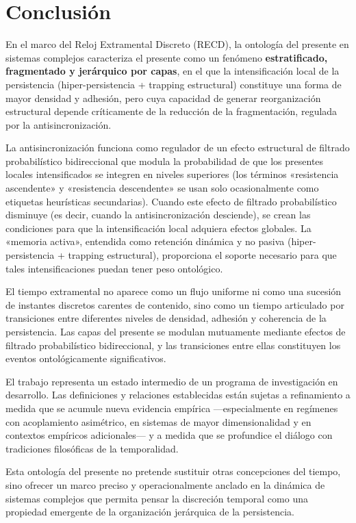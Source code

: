 \section{Conclusión}

En el marco del Reloj Extramental Discreto (RECD), la ontología del presente en sistemas complejos caracteriza el presente como un fenómeno \textbf{estratificado, fragmentado y jerárquico por capas}, en el que la intensificación local de la persistencia (hiper-persistencia + trapping estructural) constituye una forma de mayor densidad y adhesión, pero cuya capacidad de generar reorganización estructural depende críticamente de la reducción de la fragmentación, regulada por la antisincronización.

La antisincronización funciona como regulador de un efecto estructural de filtrado probabilístico bidireccional que modula la probabilidad de que los presentes locales intensificados se integren en niveles superiores (los términos «resistencia ascendente» y «resistencia descendente» se usan solo ocasionalmente como etiquetas heurísticas secundarias). Cuando este efecto de filtrado probabilístico disminuye (es decir, cuando la antisincronización desciende), se crean las condiciones para que la intensificación local adquiera efectos globales. La «memoria activa», entendida como retención dinámica y no pasiva (hiper-persistencia + trapping estructural), proporciona el soporte necesario para que tales intensificaciones puedan tener peso ontológico.

El tiempo extramental no aparece como un flujo uniforme ni como una sucesión de instantes discretos carentes de contenido, sino como un tiempo articulado por transiciones entre diferentes niveles de densidad, adhesión y coherencia de la persistencia. Las capas del presente se modulan mutuamente mediante efectos de filtrado probabilístico bidireccional, y las transiciones entre ellas constituyen los eventos ontológicamente significativos.

El trabajo representa un estado intermedio de un programa de investigación en desarrollo. Las definiciones y relaciones establecidas están sujetas a refinamiento a medida que se acumule nueva evidencia empírica —especialmente en regímenes con acoplamiento asimétrico, en sistemas de mayor dimensionalidad y en contextos empíricos adicionales— y a medida que se profundice el diálogo con tradiciones filosóficas de la temporalidad.

Esta ontología del presente no pretende sustituir otras concepciones del tiempo, sino ofrecer un marco preciso y operacionalmente anclado en la dinámica de sistemas complejos que permita pensar la discreción temporal como una propiedad emergente de la organización jerárquica de la persistencia.